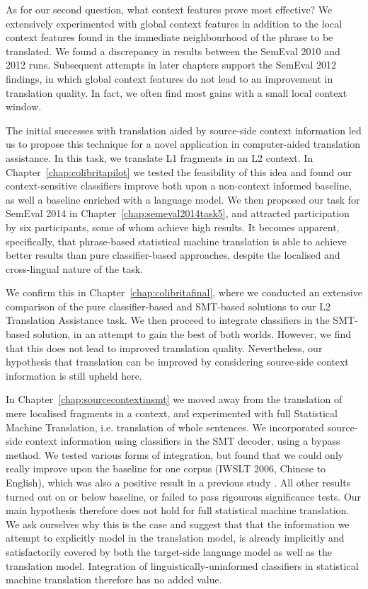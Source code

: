 As for our second question, what context features prove most effective? We extensively experimented with global context
features in addition to the local context features found in the immediate neighbourhood of the phrase to be
translated. We found a discrepancy in results between the SemEval 2010 and 2012 runs. Subsequent attempts in later
chapters support the SemEval 2012 findings, in which global context features do not lead to an improvement in
translation quality. In fact, we often find most gains with a small local context window.

The initial successes with translation aided by source-side context information
led us to propose this technique for a novel application in computer-aided translation
assistance. In this task, we translate L1 fragments in an L2 context.
In Chapter~\ref{chap:colibritapilot} we tested the feasibility of this idea and
found our context-sensitive classifiers improve both upon a non-context informed
baseline, as well a baseline enriched with a language model. We then
proposed our task for SemEval 2014 in Chapter~\ref{chap:semeval2014task5}, and attracted
participation by six participants, some of whom achieve high results. It
becomes apparent, specifically, that phrase-based statistical machine translation is able to
achieve better results than pure classifier-based approaches, despite the
localised and cross-lingual nature of the task.

We confirm this in Chapter~\ref{chap:colibritafinal}, where we conducted an
extensive comparison of the pure classifier-based and SMT-based solutions to
our L2 Translation Assistance task. We then proceed to integrate classifiers in
the SMT-based solution, in an attempt to gain the best of both worlds. However,
we find that this does not lead to improved translation quality. Nevertheless,
our hypothesis that translation can be improved by considering source-side
context information is still upheld here.

In Chapter~\ref{chap:sourcecontextinsmt} we moved away from the translation of
mere localised fragments in a context, and experimented with full Statistical
Machine Translation, i.e. translation of whole sentences. We incorporated
source-side context information using classifiers in the SMT decoder, using a
bypass method. We tested various forms of integration, but found that we could
only really improve upon the baseline for one corpus (IWSLT 2006, Chinese to
English), which was also a positive result in a previous study \citep{Stroppa+07}. All other results turned out on or below baseline, or failed to pass
rigourous significance tests. Our main hypothesis therefore does not hold for
full statistical machine translation. We ask ourselves why this is the case and
suggest that that the information we attempt to explicitly model in the
translation model, is already implicitly and satisfactorily covered by both the
target-side language model as well as the translation model. Integration of
linguistically-uninformed classifiers in statistical machine translation
therefore has no added value.

